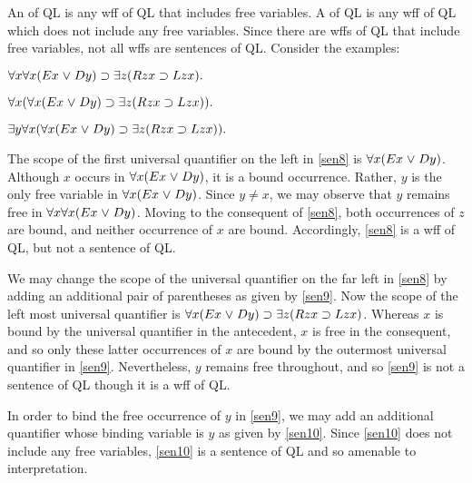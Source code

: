An  of QL is any wff of QL that includes free variables.
A  of QL is any wff of QL which does not include any free variables.
Since there are wffs of QL that include free variables, not all wffs are sentences of QL.
Consider the examples:

\begin{earg}
  \item[\ex{sen8}] $\forall x\forall x(Ex \mkern1mu\vee\mkern1mu Dy) \supset \exists z(Rzx \supset Lzx).$ 
  \item[\ex{sen9}] $\forall x(\forall x(Ex \mkern1mu\vee\mkern1mu Dy) \supset \exists z(Rzx \supset Lzx)).$ 
  \item[\ex{sen10}] $\exists y\forall x(\forall x(Ex \mkern1mu\vee\mkern1mu Dy) \supset \exists z(Rzx \supset Lzx)).$ 
\end{earg}

The scope of the first universal quantifier on the left in \ref{sen8} is $\forall x(Ex \mkern1mu\vee\mkern1mu Dy)$.
Although $x$ occurs in $\forall x(Ex \mkern1mu\vee\mkern1mu Dy)$, it is a bound occurrence. 
Rather, $y$ is the only free variable in $\forall x(Ex \mkern1mu\vee\mkern1mu Dy)$.
Since $y\neq x$, we may observe that $y$ remains free in $\forall x\forall x(Ex \mkern1mu\vee\mkern1mu Dy)$. 
Moving to the consequent of \ref{sen8}, both occurrences of $z$ are bound, and neither occurrence of $x$ are bound.
Accordingly, \ref{sen8} is a wff of QL, but not a sentence of QL.

We may change the scope of the universal quantifier on the far left in \ref{sen8} by adding an additional pair of parentheses as given by \ref{sen9}.
Now the scope of the left most universal quantifier is $\forall x(Ex \mkern1mu\vee\mkern1mu Dy) \supset \exists z(Rzx \supset Lzx)$.
Whereas $x$ is bound by the universal quantifier in the antecedent, $x$ is free in the consequent, and so only these latter occurrences of $x$ are bound by the outermost universal quantifier in \ref{sen9}. 
Nevertheless, $y$ remains free throughout, and so \ref{sen9} is not a sentence of QL though it is a wff of QL.

In order to bind the free occurrence of $y$ in \ref{sen9}, we may add an additional quantifier whose binding variable is $y$ as given by \ref{sen10}.
Since \ref{sen10} does not include any free variables, \ref{sen10} is a sentence of QL and so amenable to interpretation.







